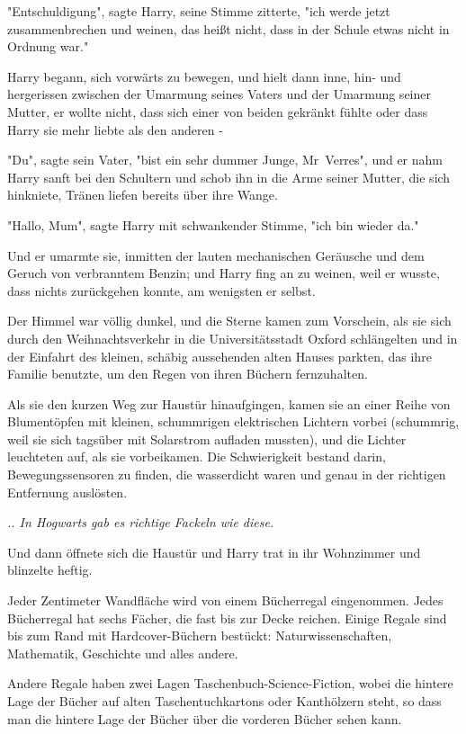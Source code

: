 {"Entschuldigung", sagte Harry, seine Stimme zitterte, "ich werde jetzt zusammenbrechen und weinen, das heißt nicht, dass in der Schule etwas nicht in Ordnung war."

Harry begann, sich vorwärts zu bewegen, und hielt dann inne, hin- und hergerissen zwischen der Umarmung seines Vaters und der Umarmung seiner Mutter, er wollte nicht, dass sich einer von beiden gekränkt fühlte oder dass Harry sie mehr liebte als den anderen -

"Du", sagte sein Vater, "bist ein sehr dummer Junge, Mr~Verres", und er nahm Harry sanft bei den Schultern und schob ihn in die Arme seiner Mutter, die sich hinkniete, Tränen liefen bereits über ihre Wange.

"Hallo, Mum", sagte Harry mit schwankender Stimme, "ich bin wieder da."

Und er umarmte sie, inmitten der lauten mechanischen Geräusche und dem Geruch von verbranntem Benzin; und Harry fing an zu weinen, weil er wusste, dass nichts zurückgehen konnte, am wenigsten er selbst.

Der Himmel war völlig dunkel, und die Sterne kamen zum Vorschein, als sie sich durch den Weihnachtsverkehr in die Universitätsstadt Oxford schlängelten und in der Einfahrt des kleinen, schäbig aussehenden alten Hauses parkten, das ihre Familie benutzte, um den Regen von ihren Büchern fernzuhalten.

Als sie den kurzen Weg zur Haustür hinaufgingen, kamen sie an einer Reihe von Blumentöpfen mit kleinen, schummrigen elektrischen Lichtern vorbei (schummrig, weil sie sich tagsüber mit Solarstrom aufladen mussten), und die Lichter leuchteten auf, als sie vorbeikamen. Die Schwierigkeit bestand darin, Bewegungssensoren zu finden, die wasserdicht waren und genau in der richtigen Entfernung auslösten.

\emph{.. In Hogwarts gab es richtige Fackeln wie diese.}

Und dann öffnete sich die Haustür und Harry trat in ihr Wohnzimmer und blinzelte heftig.

Jeder Zentimeter Wandfläche wird von einem Bücherregal eingenommen. Jedes Bücherregal hat sechs Fächer, die fast bis zur Decke reichen. Einige Regale sind bis zum Rand mit Hardcover-Büchern bestückt: Naturwissenschaften, Mathematik, Geschichte und alles andere.

Andere Regale haben zwei Lagen Taschenbuch-Science-Fiction, wobei die hintere Lage der Bücher auf alten Taschentuchkartons oder Kanthölzern steht, so dass man die hintere Lage der Bücher über die vorderen Bücher sehen kann.

}
